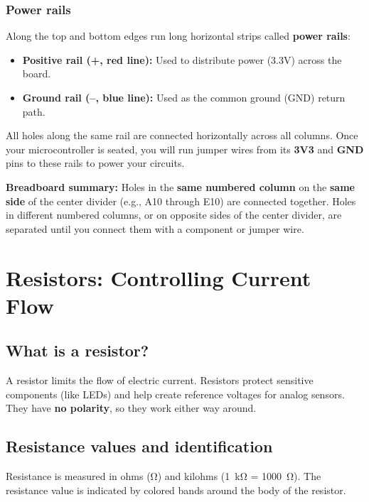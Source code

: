 \subsubsection{Power rails}
Along the top and bottom edges run long horizontal strips called \textbf{power rails}:
\begin{itemize}
    \item \textbf{Positive rail (+, red line):} Used to distribute power (3.3V) across the board.
    \item \textbf{Ground rail (--, blue line):} Used as the common ground (GND) return path.
\end{itemize}
All holes along the same rail are connected horizontally across all columns. Once your microcontroller is seated, you
will run jumper wires from its \textbf{3V3} and \textbf{GND} pins to these rails to power your circuits.

\begin{tcolorbox}[colback=blue!5!white,colframe=blue!40!black]
    \textbf{Breadboard summary:} Holes in the \textbf{same numbered column} on the \textbf{same side} of the
    center divider (e.g., A10 through E10) are connected together. Holes in different numbered columns, or on
    opposite sides of the center divider, are separated until you connect them with a component or jumper wire.
\end{tcolorbox}


\section{Resistors: Controlling Current Flow}

\subsection{What is a resistor?}
A resistor limits the flow of electric current. Resistors protect sensitive components (like LEDs)
and help create reference voltages for analog sensors. They have \textbf{no polarity}, so they work
either way around.

\subsection{Resistance values and identification}
Resistance is measured in ohms (\si{\ohm}) and kilohms (\SI{1}{\kilo\ohm} = \SI{1000}{\ohm}). The resistance
value is indicated by colored bands around the body of the resistor.




